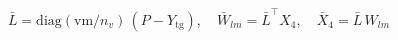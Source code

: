 \documentclass{article}
\begin{document}
\begin{preview}

\[ \bar L = \mathrm{diag}(\mathrm{vm}/n_v)\,(P - Y_{\mathrm{tg}}),\quad \bar W_{lm} = \bar L^\top X_4,\quad \bar X_4 = \bar L\, W_{lm} \]

\end{preview}
\end{document}
